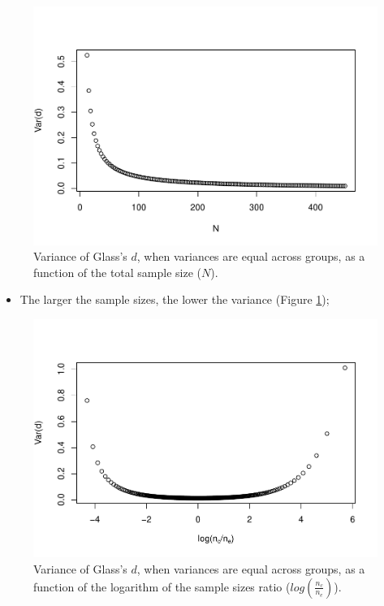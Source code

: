 \documentclass[
  english,
  man,mask]{apa6}
\providecommand{\tightlist}{%
  \setlength{\itemsep}{0pt}\setlength{\parskip}{0pt}}
\begin{document}
\begin{figure}
\centering
\includegraphics{Theoretical-Bias-of-all-estimators-as-a-function-of-population-parameters_files/figure-latex/varglassNsize2-1.pdf}
\caption{\label{fig:varglassNsize2}Variance of Glass's \(d\), when variances are equal across groups, as a function of the total sample size (\(N\)).}
\end{figure}

\begin{itemize}
\tightlist
\item
  The larger the sample sizes, the lower the variance (Figure \ref{fig:varglassNsize2});
\end{itemize}

\begin{figure}
\centering
\includegraphics{Theoretical-Bias-of-all-estimators-as-a-function-of-population-parameters_files/figure-latex/varglasshomNratio2-1.pdf}
\caption{\label{fig:varglasshomNratio2}Variance of Glass's \(d\), when variances are equal across groups, as a function of the logarithm of the sample sizes ratio (\(log\left(\frac{n_c}{n_e} \right)\)).}
\end{figure}
\end{document}
